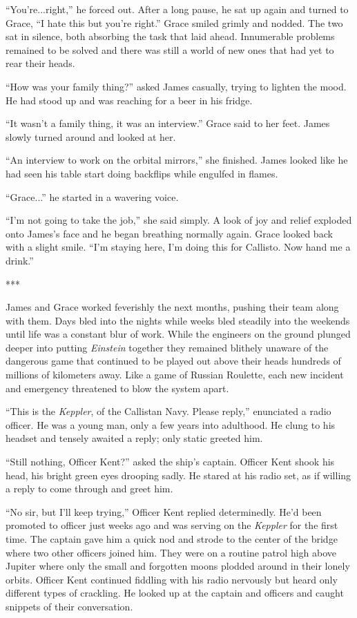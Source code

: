 \documentclass[openany, 12pt]{book} %
\begin{document}
``You're...right,'' he forced out. After a long pause, he sat up again and turned to Grace, ``I hate this but you're right.'' Grace smiled grimly and nodded. The two sat in silence, both absorbing the task that laid ahead. Innumerable problems remained to be solved and there was still a world of new ones that had yet to rear their heads.

``How was your family thing?'' asked James casually, trying to lighten the mood. He had stood up and was reaching for a beer in his fridge.

``It wasn't a family thing, it was an interview.'' Grace said to her feet. James slowly turned around and looked at her.

``An interview to work on the orbital mirrors,'' she finished. James looked like he had seen his table start doing backflips while engulfed in flames.

``Grace...'' he started in a wavering voice.

``I'm not going to take the job,'' she said simply. A look of joy and relief exploded onto James's face and he began breathing normally again. Grace looked back with a slight smile. ``I'm staying here, I'm doing this for Callisto. Now hand me a drink.''

\begin{center}
***
\end{center}

James and Grace worked feverishly the next months, pushing their team along with them. Days bled into the nights while weeks bled steadily into the weekends until life was a constant blur of work. While the engineers on the ground plunged deeper into putting \textit{Einstein} together they remained blithely unaware of the dangerous game that continued to be played out above their heads hundreds of millions of kilometers away. Like a game of Russian Roulette, each new incident and emergency threatened to blow the system apart. 

``This is the \textit{Keppler}, of the Callistan Navy. Please reply,'' enunciated a radio officer. He was a young man, only a few years into adulthood. He clung to his headset and tensely awaited a reply; only static greeted him.

``Still nothing, Officer Kent?'' asked the ship's captain. Officer Kent shook his head, his bright green eyes drooping sadly. He stared at his radio set, as if willing a reply to come through and greet him.

``No sir, but I'll keep trying,'' Officer Kent replied determinedly. He'd been promoted to officer just weeks ago and was serving on the \textit{Keppler} for the first time.  The captain gave him a quick nod and strode to the center of the bridge where two other officers joined him. They were on a routine patrol high above Jupiter where only the small and forgotten moons plodded around in their lonely orbits. Officer Kent continued fiddling with his radio nervously but heard only different types of crackling. He looked up at the captain and officers and caught snippets of their conversation.
\end{document}
